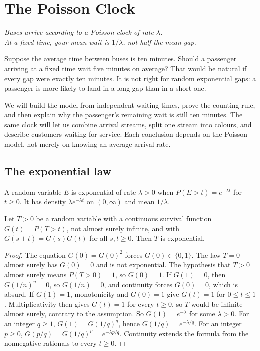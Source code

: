 \chapter{The Poisson Clock}

\begin{center}\itshape
Buses arrive according to a Poisson clock of rate $\lambda$.\\
At a fixed time, your mean wait is $1/\lambda$, not half the mean gap.
\end{center}

Suppose the average time between buses is ten minutes. Should a passenger arriving at a fixed time wait five minutes on average? That would be natural if every gap were exactly ten minutes. It is not right for random exponential gaps: a passenger is more likely to land in a long gap than in a short one.

We will build the model from independent waiting times, prove the counting rule, and then explain why the passenger's remaining wait is still ten minutes. The same clock will let us combine arrival streams, split one stream into colours, and describe customers waiting for service. Each conclusion depends on the Poisson model, not merely on knowing an average arrival rate.

\section{The exponential law}

A random variable $E$ is exponential of rate $\lambda>0$ when $P(E>t)=e^{-\lambda t}$ for $t\ge0$. It has density $\lambda e^{-\lambda t}$ on $(0,\infty)$ and mean $1/\lambda$.

\begin{proposition}[memorylessness]\label{prop:memoryless}
Let $T>0$ be a random variable with a continuous survival function $G(t)=P(T>t)$, not almost surely infinite, and with $G(s+t)=G(s)G(t)$ for all $s,t\ge0$. Then $T$ is exponential.
\end{proposition}
\begin{proof}
The equation $G(0)=G(0)^2$ forces $G(0)\in\{0,1\}$. The law $T=0$ almost surely has $G(0)=0$ and is not exponential. The hypothesis that $T>0$ almost surely means $P(T>0)=1$, so $G(0)=1$. If $G(1)=0$, then $G(1/n)^n=0$, so $G(1/n)=0$, and continuity forces $G(0)=0$, which is absurd. If $G(1)=1$, monotonicity and $G(0)=1$ give $G(t)=1$ for $0\le t\le1$. Multiplicativity then gives $G(t)=1$ for every $t\ge0$, so $T$ would be infinite almost surely, contrary to the assumption. So $G(1)=e^{-\lambda}$ for some $\lambda>0$. For an integer $q\ge1$, $G(1)=G(1/q)^q$, hence $G(1/q)=e^{-\lambda/q}$. For an integer $p\ge0$, $G(p/q)=G(1/q)^p=e^{-\lambda p/q}$. Continuity extends the formula from the nonnegative rationals to every $t\ge0$.
\end{proof}

